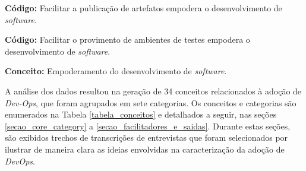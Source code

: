 {\bf Código:} Facilitar a publicação de artefatos empodera o desenvolvimento de
{\it software}.

{\bf Código:} Facilitar o provimento de ambientes de testes empodera o
desenvolvimento de {\it software}.

{\bf Conceito:} Empoderamento do desenvolvimento de {\it software}.

A análise dos dados resultou na geração de 34 conceitos relacionados à adoção
de {\it Dev-Ops}, que foram agrupados em sete categorias. Os conceitos e
categorias são enumerados na Tabela \ref{tabela_conceitos} e detalhados a
seguir, nas seções \ref{secao_core_category} a \ref{secao_facilitadores_e_saidas}.
Durante estas seções, são exibidos trechos de transcrições de entrevistas que
foram selecionados por ilustrar de maneira clara as ideias envolvidas na
caracterização da adoção de {\it DevOps}.


